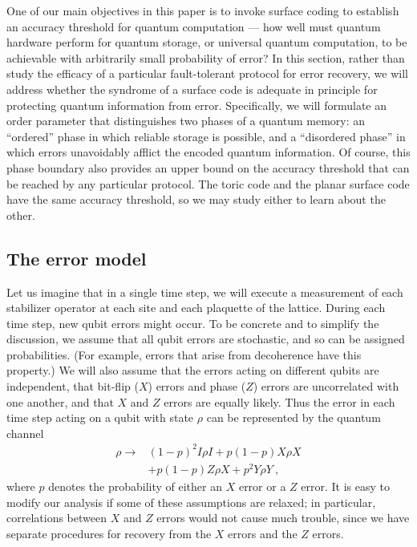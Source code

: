 One of our main objectives in this paper is to invoke surface coding to establish an accuracy threshold for quantum computation --- how well must quantum hardware perform for quantum storage, or universal quantum computation, to be achievable with arbitrarily small probability of error? In this section, rather than study the efficacy of a particular fault-tolerant protocol for error recovery, we will address whether the syndrome of a surface code is adequate in principle for protecting quantum information from error. Specifically, we will formulate an order parameter that distinguishes two phases of a quantum memory: an ``ordered'' phase in which reliable storage is possible, and a ``disordered phase'' in which errors unavoidably afflict the encoded quantum information.  Of course, this phase boundary also provides an upper bound on the accuracy threshold that can be reached by any particular protocol. The toric code and the planar surface code have the same accuracy threshold, so we may study either to learn about the other.


\subsection{The error model}
\label{sec:error_model}

Let us imagine that in a single time step, we will execute a measurement of
each stabilizer operator at each site and each plaquette of the lattice.
During each time step, new qubit errors might occur.  To be concrete and to simplify the discussion, we assume that all qubit errors are stochastic, and so can be assigned probabilities. (For example, errors that arise from decoherence have this property.) We will also assume that the errors acting on different qubits are independent, that  bit-flip ($X$) errors and phase ($Z$) errors are uncorrelated with one another, and that $X$ and $Z$ errors are equally likely. Thus the error in each time step acting on a qubit with state $\rho$ can be represented by the quantum channel
\begin{eqnarray}
\rho \to & (1-p)^2 I\rho I + p(1-p) X\rho X  \nonumber\\
& +p(1-p) Z\rho X + p^2 Y\rho Y~,
\end{eqnarray}
where $p$ denotes the probability of either an $X$ error or a $Z$ error. It is easy to modify our analysis if some of these assumptions are relaxed; in particular, correlations between $X$ and $Z$ errors would not cause much trouble, since we have separate procedures for recovery from the $X$ errors and the $Z$ errors.

